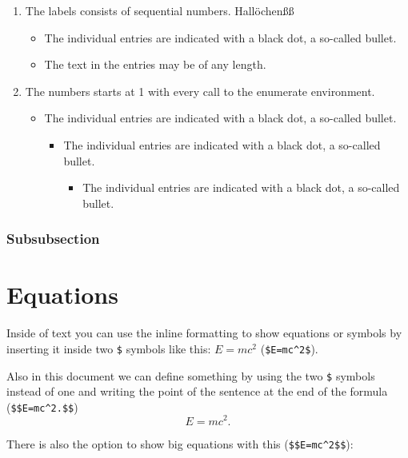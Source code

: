\documentclass{article}				%
\begin{document}
\begin{enumerate}
	\item The labels consists of sequential numbers. Hallöchenßß
	\begin{itemize}
		\item The individual entries are indicated with a black dot, a so-called bullet.
		\item The text in the entries may be of any length.
	\end{itemize}
	\item The numbers starts at 1 with every call to the enumerate environment.
	\begin{itemize}
		\item The individual entries are indicated with a black dot, a so-called bullet.
		\begin{itemize}
			\item The individual entries are indicated with a black dot, a so-called bullet.
			\begin{itemize}
				\item The individual entries are indicated with a black dot, a so-called bullet.
			\end{itemize}
		\end{itemize}
	\end{itemize}
\end{enumerate}

\subsubsection{Subsubsection}


\section{Equations}

Inside of text you can use the inline formatting to show equations or symbols by inserting it inside two \verb|$| symbols like this: $E=mc^2$ (\verb|$E=mc^2$|).

\vspace{5mm} %

Also in this document we can define something by using the two \verb|$| symbols instead of one and writing the point of the sentence at the end of the formula (\verb|$$E=mc^2.$$|)  $$E=mc^2.$$

\vspace{5mm} %

There is also the option to show big equations with this (\verb|$$E=mc^2$$|):
\end{document}
